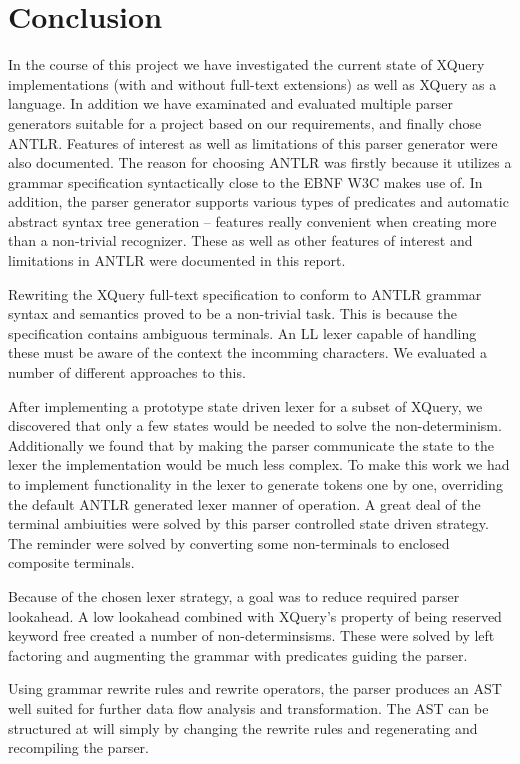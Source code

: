 \chapter{Conclusion}
\label{chapter:conclusion}

In the course of this project we have investigated the current state of XQuery implementations (with and without full-text extensions) as well as XQuery as a language. In addition we have examinated and evaluated multiple parser generators suitable for a project based on our requirements, and finally chose ANTLR. Features of interest as well as limitations of this parser generator were also documented.
The reason for choosing ANTLR was firstly because it utilizes a grammar specification syntactically close to the EBNF W3C makes use of. In addition, the parser generator supports various types of predicates and automatic abstract syntax tree generation -- features really convenient when creating more than a non-trivial recognizer. These as well as other features of interest and limitations in ANTLR were documented in this report.

Rewriting the XQuery full-text specification to conform to ANTLR grammar syntax and semantics proved to be a non-trivial task. This is because the specification contains ambiguous terminals. An LL lexer capable of handling these must be aware of the context the incomming characters. We evaluated a number of different approaches to this. 

After implementing a prototype state driven lexer for a subset of XQuery, we discovered that only a few states would be needed to solve the non-determinism. Additionally we found that by making the parser communicate the state to the lexer the implementation would be much less complex. To make this work we had to implement functionality in the lexer to generate tokens one by one, overriding the default ANTLR generated lexer manner of operation. A great deal of the terminal ambiuities were solved by this parser controlled state driven strategy. The reminder were solved by converting some non-terminals to enclosed composite terminals.

Because of the chosen lexer strategy, a goal was to reduce required parser lookahead. A low lookahead combined with XQuery's property of being reserved keyword free created a number of non-determinsisms. These were solved by left factoring and augmenting the grammar with predicates guiding the parser.

Using grammar rewrite rules and rewrite operators, the parser produces an AST well suited for further data flow analysis and transformation. The AST can be structured at will simply by changing the rewrite rules and regenerating and recompiling the parser.

